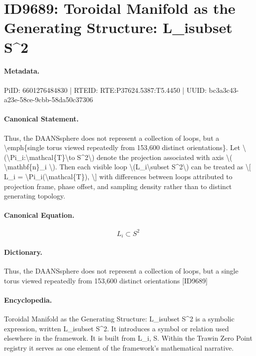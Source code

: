 \section*{ID9689: Toroidal Manifold as the Generating Structure: L\_isubset S\textasciicircum{}2}
\paragraph{Metadata.}
PiID: 6601276484830 | RTEID: RTE:P37624.5387:T5.4450 | UUID: bc3a3c43-a23e-58ce-9cbb-58da50c37306

\paragraph{Canonical Statement.}
Thus, the DAANSsphere does not represent a collection of loops, but a \textbackslash{}emph\{single torus viewed repeatedly from 153,600 distinct orientations\}. Let \textbackslash{}(\textbackslash{}Pi\_i:\textbackslash{}mathcal\{T\}\textbackslash{}to S\textasciicircum{}2\textbackslash{}) denote the projection associated with axis \textbackslash{}( \textbackslash{}mathbf\{n\}\_i \textbackslash{}). Then each visible loop \textbackslash{}(L\_i\textbackslash{}subset S\textasciicircum{}2\textbackslash{}) can be treated as \textbackslash{}[ L\_i = \textbackslash{}Pi\_i(\textbackslash{}mathcal\{T\}), \textbackslash{}] with differences between loops attributed to projection frame, phase offset, and sampling density rather than to distinct generating topology.

\paragraph{Canonical Equation.}
\[
L_i\subset S^2
\]

\paragraph{Dictionary.}
Thus, the DAANSsphere does not represent a collection of loops, but a single torus viewed repeatedly from 153,600 distinct orientations [ID9689]

\paragraph{Encyclopedia.}
Toroidal Manifold as the Generating Structure: L\_isubset S\textasciicircum{}2 is a symbolic expression, written L\_isubset S\textasciicircum{}2. It introduces a symbol or relation used elsewhere in the framework. It is built from L\_i, S. Within the Trawin Zero Point registry it serves as one element of the framework's mathematical narrative.

